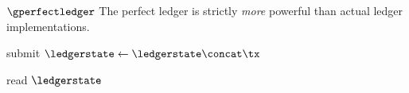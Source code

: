 \begin{functionality}{$\gperfectledger$}
    The perfect ledger is strictly \emph{more} powerful than actual ledger
    implementations.%
    \begin{statedecl}
    \end{statedecl}
    \begin{receive}{submit}{\tx}
        \State \Let $\ledgerstate \gets \ledgerstate \concat \tx$
    \end{receive}
    \begin{receive}{read}{}
        \State \Return $\ledgerstate$
    \end{receive}
\end{functionality}
